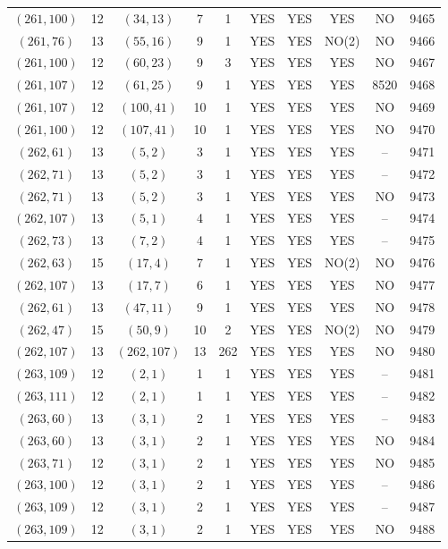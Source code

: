 \begin{longtable}{|c|c|c|c|c|c|c|c|c|c|}
$(261, 100)$ & 12 & $(34, 13)$ & 7 & 1 & YES & YES & YES & NO & 9465\\
$(261, 76)$ & 13 & $(55, 16)$ & 9 & 1 & YES & YES & NO(2) & NO & 9466\\
$(261, 100)$ & 12 & $(60, 23)$ & 9 & 3 & YES & YES & YES & NO & 9467\\
$(261, 107)$ & 12 & $(61, 25)$ & 9 & 1 & YES & YES & YES & 8520 & 9468\\
$(261, 107)$ & 12 & $(100, 41)$ & 10 & 1 & YES & YES & YES & NO & 9469\\
$(261, 100)$ & 12 & $(107, 41)$ & 10 & 1 & YES & YES & YES & NO & 9470\\
$(262, 61)$ & 13 & $(5, 2)$ & 3 & 1 & YES & YES & YES & -- & 9471\\
$(262, 71)$ & 13 & $(5, 2)$ & 3 & 1 & YES & YES & YES & -- & 9472\\
$(262, 71)$ & 13 & $(5, 2)$ & 3 & 1 & YES & YES & YES & NO & 9473\\
$(262, 107)$ & 13 & $(5, 1)$ & 4 & 1 & YES & YES & YES & -- & 9474\\
$(262, 73)$ & 13 & $(7, 2)$ & 4 & 1 & YES & YES & YES & -- & 9475\\
$(262, 63)$ & 15 & $(17, 4)$ & 7 & 1 & YES & YES & NO(2) & NO & 9476\\
$(262, 107)$ & 13 & $(17, 7)$ & 6 & 1 & YES & YES & YES & NO & 9477\\
$(262, 61)$ & 13 & $(47, 11)$ & 9 & 1 & YES & YES & YES & NO & 9478\\
$(262, 47)$ & 15 & $(50, 9)$ & 10 & 2 & YES & YES & NO(2) & NO & 9479\\
$(262, 107)$ & 13 & $(262, 107)$ & 13 & 262 & YES & YES & YES & NO & 9480\\
$(263, 109)$ & 12 & $(2, 1)$ & 1 & 1 & YES & YES & YES & -- & 9481\\
$(263, 111)$ & 12 & $(2, 1)$ & 1 & 1 & YES & YES & YES & -- & 9482\\
$(263, 60)$ & 13 & $(3, 1)$ & 2 & 1 & YES & YES & YES & -- & 9483\\
$(263, 60)$ & 13 & $(3, 1)$ & 2 & 1 & YES & YES & YES & NO & 9484\\
$(263, 71)$ & 12 & $(3, 1)$ & 2 & 1 & YES & YES & YES & NO & 9485\\
$(263, 100)$ & 12 & $(3, 1)$ & 2 & 1 & YES & YES & YES & -- & 9486\\
$(263, 109)$ & 12 & $(3, 1)$ & 2 & 1 & YES & YES & YES & -- & 9487\\
$(263, 109)$ & 12 & $(3, 1)$ & 2 & 1 & YES & YES & YES & NO & 9488\\

\end{longtable}
